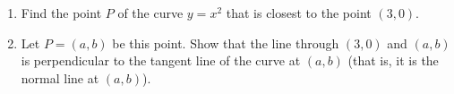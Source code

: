 \begin{enumerate}
\item[(a)] Find the point $P$ of the curve $y=x^2$ that is closest to the point $(3,0)$.
\item[(b)] Let $P=(a,b)$ be this point. Show that the line through $(3,0)$ and $(a,b)$ is perpendicular to the tangent line of the curve at $(a,b)$ (that is, it is the normal line at $(a,b)$).
\end{enumerate}
